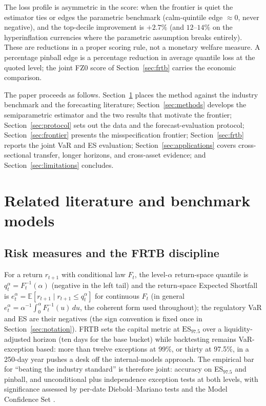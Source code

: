 \documentclass[11pt]{article}
\newcommand{\ES}{\mathrm{ES}}
\theoremstyle{remark}
\begin{document}
The loss profile is asymmetric in the score: when the frontier is
quiet the estimator ties or edges the parametric benchmark (calm-quintile
edge $\approx 0$, never negative), and the top-decile improvement is
$+2.7\%$ (and $12$--$14\%$ on the hyperinflation currencies where the
parametric assumption breaks entirely). These are reductions in a
proper scoring rule, not a monetary welfare measure. A
percentage pinball edge is a percentage reduction in average quantile
loss at the quoted level; the joint FZ0 score of
Section~\ref{sec:frtb} carries the economic comparison.

\medskip\noindent The paper proceeds as follows.
Section~\ref{sec:background} places the method against the industry
benchmark and the forecasting literature; Section~\ref{sec:methods}
develops the semiparametric estimator and the two results that motivate
the frontier; Section~\ref{sec:protocol} sets out the data and the
forecast-evaluation protocol; Section~\ref{sec:frontier} presents the
misspecification frontier; Section~\ref{sec:frtb} reports the joint VaR
and ES evaluation; Section~\ref{sec:applications} covers cross-sectional
transfer, longer horizons, and cross-asset evidence; and
Section~\ref{sec:limitations} concludes.

\section{Related literature and benchmark models}\label{sec:background}

\subsection{Risk measures and the FRTB discipline}

For a return $r_{t+1}$ with conditional law $F_t$, the level-$\alpha$
return-space quantile is $q_t^\alpha = F_t^{-1}(\alpha)$ (negative in
the left tail) and the return-space Expected Shortfall is
$e_t^\alpha = \mathbb{E}[r_{t+1} \mid r_{t+1} \le q_t^\alpha]$ for continuous
$F_t$ (in general $e_t^\alpha=\alpha^{-1}\!\int_0^\alpha F_t^{-1}(u)\,du$, the
coherent form used throughout);
the regulatory VaR and ES are their negatives (the sign convention is
fixed once in Section~\ref{sec:notation}). FRTB
\citep{bcbs2019frtb} sets the
capital metric at $\ES_{97.5}$ over a liquidity-adjusted horizon (ten
days for the base bucket) while backtesting remains VaR-exception based:
more than twelve exceptions at 99\%, or thirty at 97.5\%, in a 250-day
year pushes a desk off the internal-models approach. The empirical bar
for ``beating the industry standard'' is
therefore joint: accuracy on ES$_{97.5}$ and pinball, and
unconditional \citep{kupiec1995} plus independence
\citep{christoffersen1998} exception tests at both levels, with
significance assessed by per-date Diebold--Mariano tests
\citep{dieboldmariano1995} and the Model Confidence Set
\citep{hansen2011mcs}.
\end{document}
